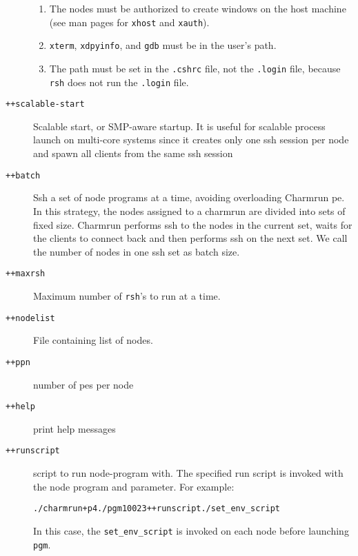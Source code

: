 \begin{description}
\begin{enumerate}
\item The nodes must be authorized to create windows on the host machine (see
man pages for {\tt xhost} and {\tt xauth}).

\item {\tt xterm}, {\tt xdpyinfo},  and {\tt gdb} must be in
the user's path.

\item The path must be set in the {\tt .cshrc} file, not the {\tt .login}
file, because {\tt rsh} does not run the {\tt .login} file. 

\end{enumerate}

\item[{\tt ++scalable-start}]   Scalable start, or SMP-aware startup. It is useful for scalable process launch on multi-core systems since it creates only one ssh session per node and spawn all clients from the same ssh session                                                       

\item[{\tt ++batch}]            Ssh a set of node programs at a time, avoiding overloading Charmrun pe.  In this strategy, the nodes assigned to a charmrun are divided into sets of fixed size. Charmrun performs ssh to the nodes in the current set, waits for the clients to connect back and then performs ssh on the next set. We call the number of nodes in one ssh set as batch size. 

\item[{\tt ++maxrsh}] Maximum number of {\tt rsh}'s to run at a 
time.

\item[{\tt ++nodelist}] File containing list of nodes.


\item[{\tt ++ppn}]              number of pes per node

\item[{\tt ++help}]             print help messages

\item[{\tt ++runscript}]        script to run node-program with. The specified run script is invoked with the node program and parameter. For example: 

\begin{alltt}
./charmrun +p4 ./pgm 100 2 3 ++runscript ./set\_env\_script
\end{alltt}

In this case, the {\tt set\_env\_script} is invoked on each node before launching {\tt pgm}.


\end{description}
